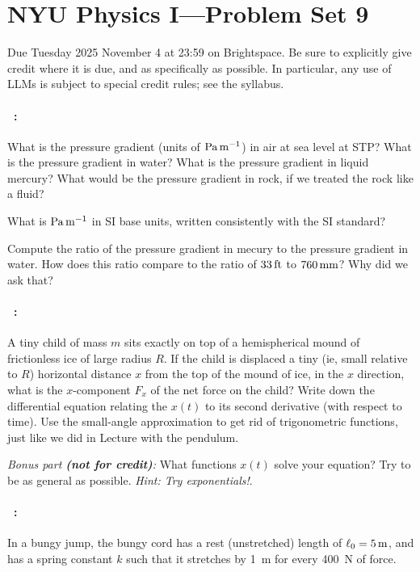 \documentclass[12pt]{article}
\begin{document}
\section*{NYU Physics I---Problem Set 9}

Due Tuesday 2025 November 4 at 23:59 on Brightspace.
Be sure to explicitly give credit where it is due, and as specifically as possible.
In particular, any use of LLMs is subject to special credit rules; see the syllabus.

\paragraph{\problemname~\theproblem:}%
What is the pressure gradient (units of $\mathrm{Pa}\,\mathrm{m}^{-1}$) in air at sea level at STP?
What is the pressure gradient in water?
What is the pressure gradient in liquid mercury?
What would be the pressure gradient in rock, if we treated the rock like a fluid?

What is $\mathrm{Pa}\,\mathrm{m}^{-1}$ in SI base units, written consistently with the SI standard?

Compute the ratio of the pressure gradient in mecury to the pressure gradient
in water. How does this ratio compare to the ratio of $33\,\mathrm{ft}$ to $760\,\mathrm{mm}$?
Why did we ask that?

\paragraph{\problemname~\theproblem:}%
A tiny child of mass $m$ sits exactly on top of a hemispherical mound of
frictionless ice of large radius $R$.  If the child is displaced a tiny (ie,
small relative to $R$) horizontal distance $x$ from the top of the
mound of ice, in the $x$ direction, what is the $x$-component $F_x$ of the net force on the
child?  Write down the differential equation relating the $x(t)$ to
its second derivative (with respect to time).  Use the small-angle
approximation to get rid of trigonometric functions, just like we did in Lecture with the pendulum.

\emph{Bonus part \textbf{(not for credit)}:} What functions
$x(t)$ solve your equation?  Try to be as general as possible.
\emph{Hint: Try exponentials!}.

\paragraph{\problemname~\theproblem:}%
In a bungy jump, the bungy cord has a rest (unstretched) length of
$\ell_0 = 5\,\mathrm{m}$, and has a spring constant $k$ such that it stretches
by 1~m for every 400~N of force.
\end{document}
